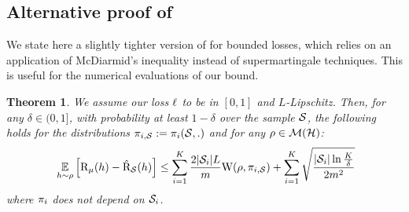 \documentclass{article}
\newtheorem{theorem}[definition]{Theorem}
\begin{document}
\subsection{Alternative proof of }
\label{sec:alt-proof-supervised}


We state here a slightly tighter version of  for bounded losses, which relies on an application of McDiarmid's inequality instead of supermartingale techniques.
This is useful for the numerical evaluations of our bound.

\begin{theorem}\label{theorem:supervised_tight}
We assume our loss $\loss$ to be in $[0,1]$ and $L$-Lipschitz.
Then, for any $\delta\in(0,1]$, with probability at least $1-\delta$ over the sample $\S$, the following holds for the distributions $\P_{i,\S}\defeq \P_i(\S,.)$ and for any $\Q\in\Mcal(\H)$:
\begin{align*}
\ \EE_{h\sim\Q}\Big[ \Risk_{\D}(h) - \Riskhat_{\S}(h) \Big] \le \sum_{i=1}^{K} \frac{2|\S_i|L}{m} \W(\Q, \P_{i,\S}) + \sum_{i=1}^{K} \sqrt{\frac{|\S_i|\ln\frac{K}{\delta}}{2m^2}} 
\end{align*}
where $\P_i$ {\it does not} depend on $\S_i$.
\end{theorem}
\end{document}
